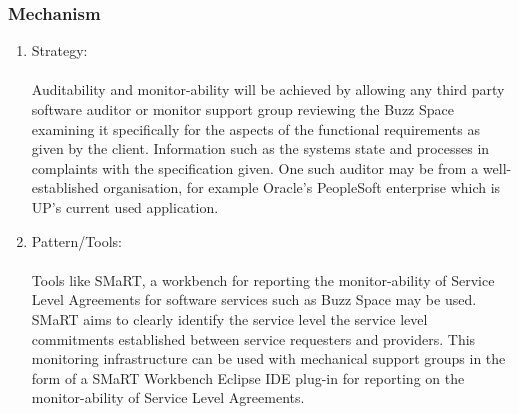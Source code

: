 	\subsubsection*{Mechanism}
		\begin{enumerate}
			\item Strategy:\\\\
			Auditability and monitor-ability will be achieved by allowing any third party software auditor or monitor support group reviewing the Buzz Space examining it specifically for the aspects of the functional requirements as given by the client. Information such as the systems state and processes in complaints with the specification given. One such auditor may be from a well-established organisation, for example Oracle’s PeopleSoft enterprise which is UP’s current used application.	
			
			
			 \item Pattern/Tools:\\\\
			 Tools like SMaRT, a workbench for reporting the monitor-ability of Service Level Agreements for software services such as Buzz Space may be used. SMaRT aims to clearly identify the service level the service level commitments established between service requesters and providers. This monitoring infrastructure can be used with mechanical support groups in the form of a SMaRT Workbench Eclipse IDE plug-in for reporting on the monitor-ability of Service Level Agreements.
			 
		\end{enumerate}
